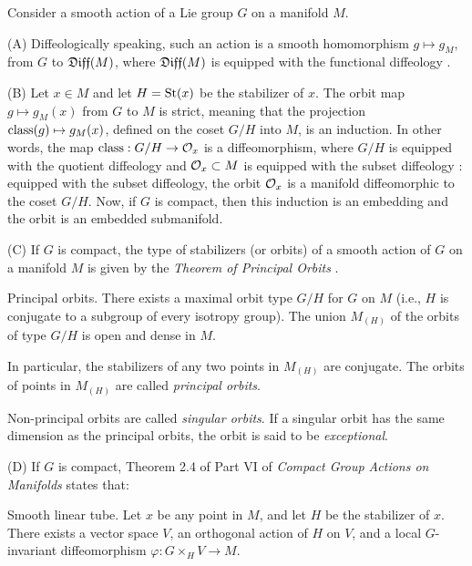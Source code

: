 Consider a smooth action of a Lie group $G$ on a manifold $M$.

(A) Diffeologically speaking,
such an action is a smooth homomorphism $g \mapsto g_M$,
from $G$ to $\mathfrak{Diff}(M)$,
where $\mathfrak{Diff}(M)$ is equipped with the functional diffeology \cite[\textsection\,7.4]{PIZ13}.

(B) Let $x \in M$ and let $H = \mathrm{St}(x)$ be the stabilizer of $x$.
The orbit map $g \mapsto g_M(x)$ from $G$ to $M$ is strict,
meaning that the projection $\operatorname{class}(g) \mapsto g_M(x)$,
defined on the coset $G/H$ into $M$, is an induction.
In other words,
the map $\operatorname{class}: G/H \to \mathcal{O}_x$ is a diffeomorphism,
where $G/H$ is equipped with the quotient diffeology and $\mathcal{O}_x \subset M$ is equipped with the subset diffeology \cite[\textsection\,1]{IZK12}:
equipped with the subset diffeology,
the orbit $\mathcal{O}_x$ is a manifold diffeomorphic to the coset $G/H$.
Now,
if $G$ is compact,
then this induction is an embedding and the orbit is an embedded submanifold.

(C) If $G$ is compact,
the type of stabilizers (or orbits) of a smooth action of $G$ on a manifold $M$
is given by the \emph{Theorem of Principal Orbits} \cite[Theorem 3.1 of Part IV]{Bre72}.

\begin{Article}{Principal orbits.}{}
  There exists a maximal orbit type $G/H$ for $G$ on $M$
  (i.e., $H$ is conjugate to a subgroup of every isotropy group).
  The union $M_{(H)}$ of the orbits of type $G/H$ is open and dense in $M$.
  
  In particular,
  the stabilizers of any two points in $M_{(H)}$ are conjugate.
  The orbits of points in $M_{(H)}$ are called \emph{principal orbits}.
\end{Article}

Non-principal orbits are called \emph{singular orbits}.
If a singular orbit has the same dimension as the principal orbits,
the orbit is said to be \emph{exceptional}.

(D) If $G$ is compact,
Theorem 2.4 of Part VI of \emph{Compact Group Actions on Manifolds} \cite{Bre72} states that:

\begin{Article}{Smooth linear tube.}{}
  Let $x$ be any point in $M$,
  and let $H$ be the stabilizer of $x$.
  There exists a vector space $V$,
  an orthogonal action of $H$ on $V$,
  and a local $G$-invariant diffeomorphism $\varphi : G \times_H V \to M$.
\end{Article}

